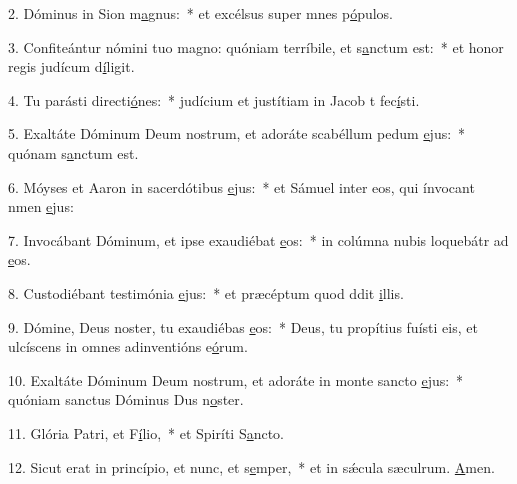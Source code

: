 2. Dóminus in Sion m\uline{a}gnus:~* et excélsus super mnes p\uline{ó}pulos.\par 
3. Confiteántur nómini tuo magno: quóniam terríbile, et s\uline{a}nctum est:~* et honor regis judícum d\uline{í}ligit.\par 
4. Tu parásti directi\uline{ó}nes:~* judícium et justítiam in Jacob t fec\uline{í}sti.\par 
5. Exaltáte Dóminum Deum nostrum, et adoráte scabéllum pedum \uline{e}jus:~* quónam s\uline{a}nctum est.\par 
6. Móyses et Aaron in sacerdótibus \uline{e}jus:~* et Sámuel inter eos, qui ínvocant nmen \uline{e}jus:\par 
7. Invocábant Dóminum, et ipse exaudiébat \uline{e}os:~* in colúmna nubis loquebátr ad \uline{e}os.\par 
8. Custodiébant testimónia \uline{e}jus:~* et præcéptum quod ddit \uline{i}llis.\par 
9. Dómine, Deus noster, tu exaudiébas \uline{e}os:~* Deus, tu propítius fuísti eis, et ulcíscens in omnes adinventións e\uline{ó}rum.\par 
10. Exaltáte Dóminum Deum nostrum, et adoráte in monte sancto \uline{e}jus:~* quóniam sanctus Dóminus Dus n\uline{o}ster.\par 
11. Glória Patri, et F\uline{í}lio,~* et Spiríti S\uline{a}ncto.\par 
12. Sicut erat in princípio, et nunc, et s\uline{e}mper,~* et in sǽcula sæculrum. \uline{A}men.\par 

